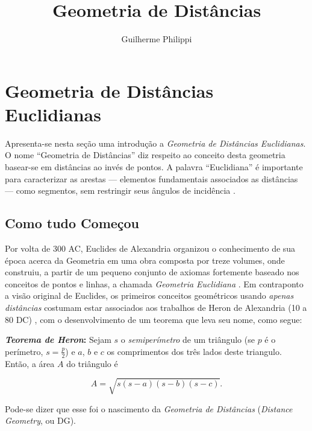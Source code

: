 \documentclass[a4paper,12pt]{article}
\title{Geometria de Distâncias}
\author{Guilherme Philippi}
\begin{document}
\maketitle
\tableofcontents

\section{Geometria de Distâncias Euclidianas}
Apresenta-se nesta seção uma introdução a \textit{Geometria de Distâncias Euclidianas}. O nome ``Geometria de Distâncias'' diz respeito ao conceito desta geometria basear-se em distâncias ao invés de pontos. A palavra ``Euclidiana'' é importante para caracterizar as arestas --- elementos fundamentais associados as distâncias --- como segmentos, sem restringir seus ângulos de incidência \cite{libertiEDG}.

\subsection{Como tudo Começou}

Por volta de 300 AC, Euclides de Alexandria organizou o conhecimento de sua época acerca da Geometria em uma obra composta por treze volumes, onde construiu, a partir de um pequeno conjunto de axiomas fortemente baseado nos conceitos de pontos e linhas, a chamada \textit{Geometria Euclidiana} \cite{elementosEuclides}. Em contraponto a visão original de Euclides, os primeiros conceitos geométricos usando \textit{apenas distâncias} costumam estar associados aos trabalhos de Heron de Alexandria (10 a 80 DC) \cite{libertiEDG}, com o desenvolvimento de um teorema que leva seu nome, como segue: 
\begin{center}
	\begin{minipage}{0.9 \linewidth}
		\textbf{\textit{Teorema de Heron}:} Sejam $s$ o \textit{semiperímetro} de um triângulo (se $p$ é o perímetro, $s = \frac{p}{2}$) e $a$, $b$ e $c$ os comprimentos dos três lados deste triangulo. Então, a área $A$ do triângulo é
		
		\begin{equation}\tag{Fórmula de Heron}
		A = \sqrt{s(s-a)(s-b)(s-c)}.
		\label{eq:heron}
		\end{equation}
	\end{minipage}
\end{center} 
Pode-se dizer que esse foi o nascimento da \textit{Geometria de Distâncias} (\textit{Distance Geometry}, ou DG).
\end{document}
